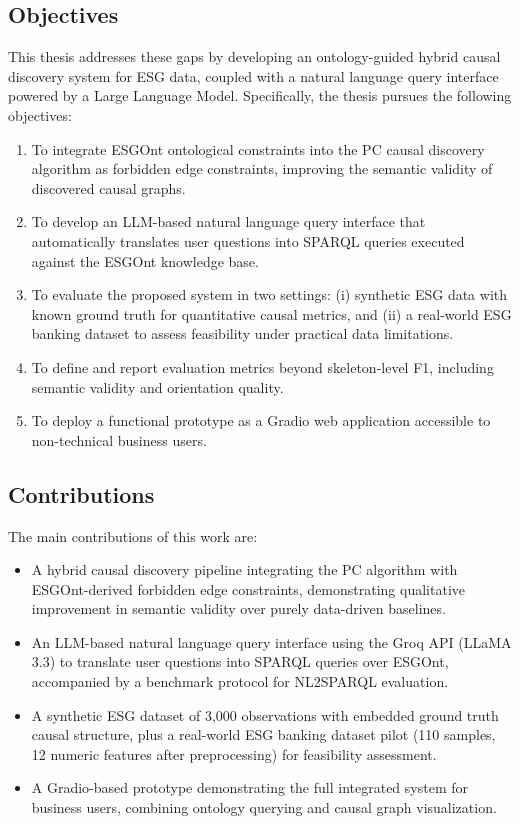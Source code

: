 \documentclass[a4paper,11pt,oneside]{article}
\begin{document}
\subsection{Objectives}

This thesis addresses these gaps by developing an ontology-guided hybrid causal discovery system for ESG data, coupled with a natural language query interface powered by a Large Language Model. Specifically, the thesis pursues the following objectives:

\begin{enumerate}
    \item To integrate ESGOnt ontological constraints into the PC causal discovery algorithm as forbidden edge constraints, improving the semantic validity of discovered causal graphs.
    \item To develop an LLM-based natural language query interface that automatically translates user questions into SPARQL queries executed against the ESGOnt knowledge base.
    \item To evaluate the proposed system in two settings: (i) synthetic ESG data with known ground truth for quantitative causal metrics, and (ii) a real-world ESG banking dataset to assess feasibility under practical data limitations.
    \item To define and report evaluation metrics beyond skeleton-level F1, including semantic validity and orientation quality.
    \item To deploy a functional prototype as a Gradio web application accessible to non-technical business users.
\end{enumerate}

\subsection{Contributions}

The main contributions of this work are:

\begin{itemize}
    \item A hybrid causal discovery pipeline integrating the PC algorithm with ESGOnt-derived forbidden edge constraints, demonstrating qualitative improvement in semantic validity over purely data-driven baselines.
    \item An LLM-based natural language query interface using the Groq API (LLaMA 3.3) to translate user questions into SPARQL queries over ESGOnt, accompanied by a benchmark protocol for NL2SPARQL evaluation.
    \item A synthetic ESG dataset of 3,000 observations with embedded ground truth causal structure, plus a real-world ESG banking dataset pilot (110 samples, 12 numeric features after preprocessing) for feasibility assessment.
    \item A Gradio-based prototype demonstrating the full integrated system for business users, combining ontology querying and causal graph visualization.
\end{itemize}
\end{document}
